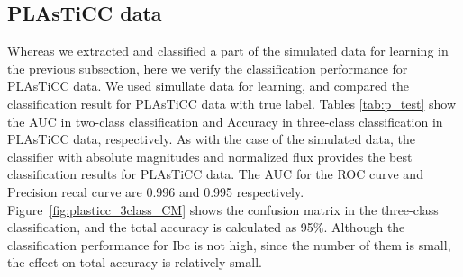 \documentclass[useamsfonts]{pasj01}
\begin{document}
\subsection{PLAsTiCC data}
Whereas we extracted and classified a part of the simulated data for learning in the previous subsection, here we verify the classification performance for PLAsTiCC data.
We used simullate data for learning, and compared the classification result for PLAsTiCC data with true label.
Tables \ref{tab:p_test} show the AUC in two-class classification and Accuracy in three-class classification in PLAsTiCC data, respectively.
As with the case of the simulated data, the classifier with absolute magnitudes and normalized flux provides the best classification results for PLAsTiCC data.
The AUC for the ROC curve and Precision recal curve are 0.996 and 0.995 respectively.
Figure\ \ref{fig:plasticc_3class_CM} shows the confusion matrix in the three-class classification, and the total accuracy is calculated as 95\%.
Although the classification performance for Ibc is not high, since the number of them is small, the effect on total accuracy is relatively small.
%
%
%
\end{document}
